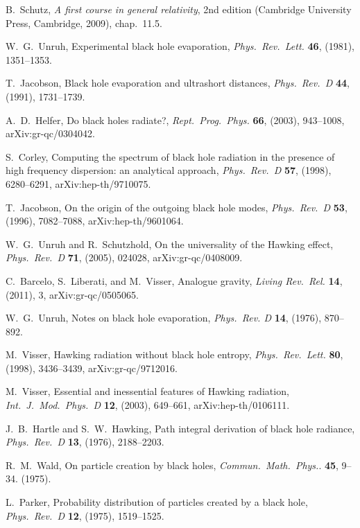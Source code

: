 \documentclass[11pt]{article}
\begin{document}
\begin{thebibliography}{999}
 B.\ Schutz, \emph{A first course in general 
relativity}, 2nd edition (Cambridge University Press, Cambridge,
2009), chap.\ 11.5.

 W.~G.\ Unruh, Experimental black hole evaporation,
\emph{Phys.\ Rev.\ Lett.} {\bf 46}, (1981), 1351--1353.

 T.\ Jacobson, Black hole evaporation and 
ultrashort distances, \emph{Phys.\ Rev.\ D} {\bf 44}, (1991),
1731--1739.

 A.~D.\ Helfer, Do black holes radiate?,
\emph{Rept.\ Prog.\ Phys.} {\bf 66}, (2003), 943--1008,
arXiv:gr-qc/0304042.

  S.\ Corley, Computing the spectrum of black 
hole radiation in the presence of high frequency dispersion: an 
analytical approach, \emph{Phys.\ Rev.\ D} {\bf 57}, (1998), 
6280--6291, arXiv:hep-th/9710075.

  T.\ Jacobson, On the origin of the outgoing 
black hole modes, \emph{Phys.\ Rev.\ D} {\bf 53},  (1996), 
7082--7088, arXiv:hep-th/9601064.

  W.~G.\ Unruh and R.\ Schutzhold, 
On the universality of the Hawking effect, \emph{Phys.\ Rev.\ D}
{\bf 71},  (2005), 024028, arXiv:gr-qc/0408009.

  C.\ Barcelo, S.\ Liberati, and M.\ Visser,
Analogue gravity, \emph{Living Rev.\ Rel.} {\bf 14}, (2011), 3,
arXiv:gr-qc/0505065.

 W.~G.\ Unruh, Notes on black hole evaporation,
\emph{Phys.\ Rev. D} {\bf 14}, (1976), 870--892.

 M.\ Visser, Hawking radiation without black hole 
entropy, \emph{Phys.\ Rev.\ Lett.} {\bf 80}, (1998), 3436--3439,
arXiv:gr-qc/9712016.

 M.\ Visser, Essential and inessential 
features of Hawking radiation, \emph{Int.\ J.\ Mod.\ Phys.\ D}
{\bf 12}, (2003), 649--661, arXiv:hep-th/0106111.

 J.~B.\ Hartle and S.~W.\ Hawking,
Path integral derivation of black hole radiance, \emph{Phys.\
Rev.\ D} {\bf 13}, (1976), 2188--2203.

 R.~M.\ Wald, On particle creation by black holes,
\emph{Commun.\ Math.\ Phys.}. {\bf 45}, 9--34. (1975).

  L.\ Parker, Probability distribution of particles 
created by a black hole, \emph{Phys.\ Rev.\ D} {\bf 12}, (1975),
1519--1525.


\end{thebibliography}
\end{document}
